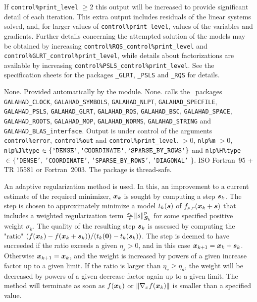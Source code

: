 \documentclass{galahad}
\newcommand{\packagename}{NLS}
\begin{document}
If {\tt control\%print\_level} $\geq 2$ this
output will be increased to provide significant detail of each iteration.
This extra output includes residuals of the linear systems solved, and,
for larger values of {\tt control\%print\_level}, values of the variables
and gradients. Further details concerning the attempted solution of the models
may be obtained by increasing
{\tt control\%RQS\_control\%print\_level}
and
{\tt control\%GLRT\_control\%print\_level},
while details about factorizations are available
by increasing
{\tt control\%PSLS\_control\%print\_level}.
See the specification sheets for the packages
{\tt \libraryname\_GLRT},
{\tt \libraryname\_PSLS} and
{\tt \libraryname\_RQS}
for details.


\galgeneral

\galcommon None.
\galworkspace Provided automatically by the module.
\galroutines None.
\galmodules {\tt \packagename\_solve} calls the \galahad\ packages
{\tt GALAHAD\_CLOCK},
{\tt GALAHAD\_SY\-M\-BOLS}, \sloppy
{\tt GALAHAD\_NLPT},
{\tt GALAHAD\_SPECFILE},
{\tt GALAHAD\_PSLS},
{\tt GALAHAD\_GLRT},
{\tt GALAHAD\_RQS},
{\tt GALAHAD\_BSC},
{\tt GALAHAD\_SPACE},
{\tt GALAHAD\_ROOTS},
{\tt GALAHAD\_MOP},
{\tt GALAHAD\_NORMS},
{\tt GALAHAD\_STRING}
and
{\tt GALAHAD\_BLAS\_interface}.
\galio Output is under control of the arguments
 {\tt control\%error}, {\tt control\%out} and
{\tt control\%print\_level}.
 $> 0$, {\tt nlp\%m} $> 0$,
{\tt nlp\%J\%type} $\in \{
  \mbox{\tt 'DENSE'}, \mbox{\tt 'COORDINATE'}, \mbox{\tt 'SPARSE\_BY\_ROWS'}
 \}$ and
{\tt nlp\%H\%type} $\in \{${\tt 'DENSE'},
 {\tt 'COORDINATE'}, {\tt 'SPARSE\_BY\_ROWS'}, {\tt 'DIAGONAL'} $\}$.
\galportability ISO Fortran~95 + TR 15581 or Fortran~2003.
The package is thread-safe.


\galmethod
An adaptive regularization method is used.
In this, an improvement to a current
estimate of the required minimizer, ${\bm{x}}_k$ is sought by computing a
step ${\bm{s}}_k$. The step is chosen to approximately minimize a model $t_k({\bm{s}})$
of $f_{\rho,r}({\bm{x}}_k+{\bm{s}})$
that includes a weighted regularization term
${\scriptstyle \frac{\sigma_k}{p}} \|s\|_{{\bm{S}}_k}^p$
for some specified positive weight $\sigma_k$. The quality of the
resulting step ${\bm{s}}_k$ is assessed by computing the "ratio"
$(f({\bm{x}}_k) - f({\bm{x}}_k + {\bm{s}}_k))/(t_k({\bm{0}}) - t_k({\bm{s}}_k))$.
The step is deemed to have succeeded if the ratio exceeds a given $\eta_s > 0$,
and in this case ${\bm{x}}_{k+1} = {\bm{x}}_k + {\bm{s}}_k$. Otherwise
${\bm{x}}_{k+1} = {\bm{x}}_k$, and the weight is increased by powers of a given
increase factor up to a given limit. If the ratio is larger than
$\eta_v \geq \eta_d$, the weight will be decreased by powers of a given
decrease factor again up to a given limit. The method will terminate
as soon as $f({\bm{x}}_k)$ or
$\|\nabla_x f({\bm{x}}_k)\|$ is smaller than a specified value.
\end{document}
